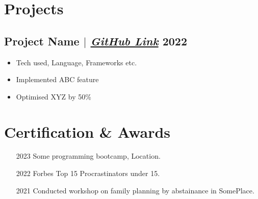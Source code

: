 \documentclass{article}
\begin{document}
\section{Projects}
\subsection{Project Name {\normalfont $|$ \href{http://github.com}{\textit{GitHub Link}}} \hfill 2022}
\begin{itemize}
    \item Tech used, Language, Frameworks etc.
    \item Implemented ABC feature
    \item Optimised XYZ by 50\%
\end{itemize}

\section{Certification \& Awards}
\begin{enumerate}[itemsep=0pt]
  \item [2023] Some programming bootcamp, Location.
  \item [2022] Forbes Top 15 Procrastinators under 15.
  \item [2021] Conducted workshop on family planning by abstainance in SomePlace.
\end{enumerate}
\end{document}
